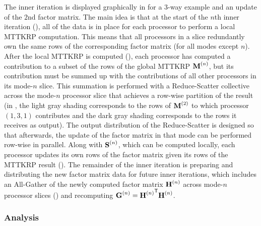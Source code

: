 The inner iteration is displayed graphically in  for a 3-way example and an update of the $2$nd factor matrix.
The main idea is that at the start of the $n$th inner iteration (), all of the data is in place for each processor to perform a local MTTKRP computation.
This means that all processors in a slice redundantly own the same rows of the corresponding factor matrix (for all modes except $n$).
After the local MTTKRP is computed (), each processor has computed a contribution to a subset of the rows of the global MTTKRP $\Mn{M}{n}$, but its contribution must be summed up with the contributions of all other processors in its mode-$n$ slice.
This summation is performed with a Reduce-Scatter collective across the mode-$n$ processor slice that achieves a row-wise partition of the result (in , the light gray shading corresponds to the rows of $\Mn{M}{2}$ to which processor $(1,3,1)$ contributes and the dark gray shading corresponds to the rows it receives as output).
The output distribution of the Reduce-Scatter is designed so that afterwards, the update of the factor matrix in that mode can be performed row-wise in parallel.
Along with $\Mn{S}{n}$, which can be computed locally, each processor updates its own rows of the factor matrix given its rows of the MTTKRP result ().
The remainder of the inner iteration is preparing and distributing the new factor matrix data for future inner iterations, which includes an All-Gather of the newly computed factor matrix $\Mn{H}{n}$ across mode-$n$ processor slices () and recomputing $\Mn{G}{n}={\Mn{H}{n}}^\Tra\Mn{H}{n}$.

\subsubsection{Analysis}

